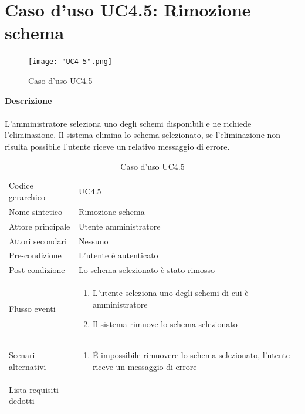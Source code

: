 \documentclass[a4paper]{report}
\begin{document}
	\section{Caso d'uso UC4.5: Rimozione schema}
	 	\begin{figure}[H]
			\centering
			\texttt{[image: "UC4-5".png]}
			\caption{Caso d'uso UC4.5}
		\end{figure}
	 \textbf{Descrizione} \\ \\
	 L'amministratore seleziona uno degli schemi disponibili e ne richiede l'eliminazione. Il sistema elimina
	 lo schema selezionato, se l'eliminazione non risulta possibile l'utente riceve un relativo messaggio di 
	 errore.
		\begin{table}[H]
		\begin{tabularx}{\textwidth}{X | X}\toprule
			\rowcolor{orange!65}Codice gerarchico & UC4.5 \\
			Nome sintetico & Rimozione schema \\
			\rowcolor{orange!65}Attore principale & Utente amministratore\\
			Attori secondari & Nessuno \\
			\rowcolor{orange!65}Pre-condizione & L'utente è autenticato\\
			Post-condizione & Lo schema selezionato è stato rimosso \\
			\rowcolor{orange!65}Flusso eventi & \begin{enumerate}
			\item L'utente seleziona uno degli schemi di cui è amministratore
			\item Il sistema rimuove lo schema selezionato
			\end{enumerate} \\
			Scenari alternativi & \begin{enumerate}
			\item \'E impossibile rimuovere lo schema selezionato, l'utente riceve un messaggio di errore
			\end{enumerate} \\
			\rowcolor{orange!65}Lista requisiti dedotti & \\
			\bottomrule
		\end{tabularx}
		\caption{Caso d'uso UC4.5}
	 \end{table}
\end{document}
